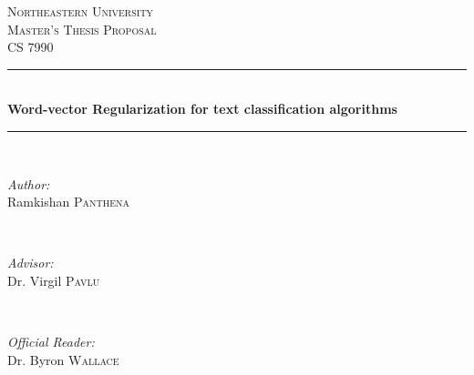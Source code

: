 \begin{titlepage}

\newcommand{\HRule}{\rule{\linewidth}{0.5mm}} %

\center %
 

\textsc{\LARGE Northeastern University}\\[1.5cm] %
\textsc{\Large Master's Thesis Proposal}\\[0.5cm] %
\textsc{\large CS 7990}\\[0.5cm] %


\HRule \\[0.4cm]
{\Large \bfseries Word-vector Regularization for text classification algorithms}\\[0.4cm] %
\HRule \\[1.5cm]
 

\begin{minipage}{0.4\textwidth}
\begin{flushleft} \large
\emph{Author:}\\
Ramkishan \textsc{Panthena} %
\end{flushleft}
\end{minipage}
~
\begin{minipage}{0.4\textwidth}
\begin{flushright} \large
\emph{Advisor:} \\
Dr. Virgil \textsc{Pavlu} %
\end{flushright}
\end{minipage}\\[.5cm]

\begin{minipage}{0.82\textwidth}
\begin{flushright} \large
\emph{Official Reader:} \\
Dr. Byron \textsc{Wallace} %
\end{flushright}
\end{minipage}\\[2cm]


\end{titlepage}
